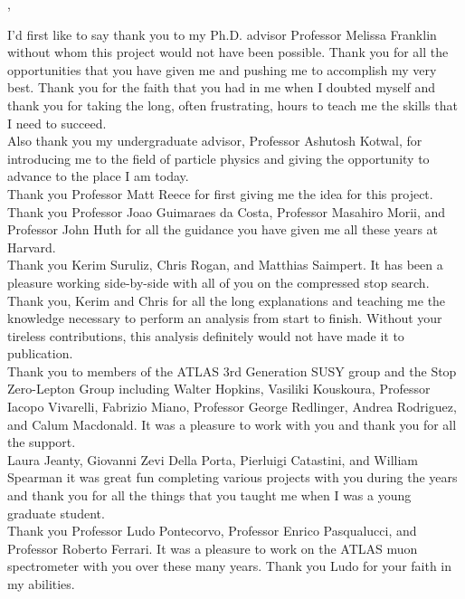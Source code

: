 
\newthought{}, 

\indent I'd first like to say thank you to my Ph.D. advisor Professor Melissa Franklin without whom this project would not have been possible.  Thank you for all the opportunities that you have given me and pushing me to accomplish my very best.  Thank you for the faith that you had in me when I doubted myself and thank you for taking the long, often frustrating, hours to teach me the skills that I need to succeed.  \\

\indent Also thank you my undergraduate advisor, Professor Ashutosh Kotwal, for introducing me to the field of particle physics and giving the opportunity to advance to the place I am today.  \\

\indent Thank you Professor Matt Reece for first giving me the idea for this project.  Thank you Professor Joao Guimaraes da Costa, Professor Masahiro Morii, and Professor John Huth for all the guidance you have given me all these years at Harvard.\\

\indent Thank you Kerim Suruliz, Chris Rogan, and Matthias Saimpert.  It has been a pleasure working side-by-side with all of you on the compressed stop search.  Thank you, Kerim and Chris for all the long explanations and teaching me the knowledge necessary to perform an analysis from start to finish.  Without your tireless contributions, this analysis definitely would not have made it to publication.  \\

\indent Thank you to members of the ATLAS 3rd Generation SUSY group and the Stop Zero-Lepton Group including Walter Hopkins, Vasiliki Kouskoura, Professor Iacopo Vivarelli, Fabrizio Miano, Professor George Redlinger, Andrea Rodriguez, and Calum Macdonald.  It was a pleasure to work with you and thank you for all the support. \\

\indent Laura Jeanty, Giovanni Zevi Della Porta, Pierluigi Catastini, and William Spearman it was great fun completing various projects with you during the years and thank you for all the things that you taught me when I was a young graduate student. \\

\indent Thank you Professor Ludo Pontecorvo, Professor Enrico Pasqualucci, and Professor Roberto Ferrari.  It was a pleasure to work on the ATLAS muon spectrometer with you over these many years. Thank you Ludo for your faith in my abilities. \\

